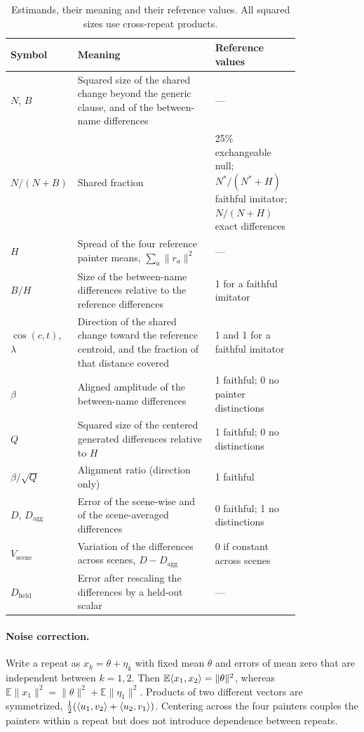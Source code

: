 \begin{table}[ht]
\caption{Estimands, their meaning and their reference values. All squared sizes use
cross-repeat products.}
\label{tab:estimands}
\vspace{2pt}
\centering\small
\begin{tabular}{@{}lp{0.52\linewidth}p{0.3\linewidth}@{}}
\toprule
Symbol & Meaning & Reference values\\
\midrule
$N$, $B$ & Squared size of the shared change beyond the generic clause, and of the
between-name differences & ---\\
$N/(N+B)$ & Shared fraction & 25\% exchangeable null; $N^*/(N^*+H)$ faithful imitator;
$N/(N+H)$ exact differences\\
$H$ & Spread of the four reference painter means, $\sum_a\|r_a\|^2$ & ---\\
$B/H$ & Size of the between-name differences relative to the reference differences & 1 for a
faithful imitator\\
$\cos(c,t)$, $\lambda$ & Direction of the shared change toward the reference centroid, and the
fraction of that distance covered & 1 and 1 for a faithful imitator\\
$\beta$ & Aligned amplitude of the between-name differences & 1 faithful; 0 no painter
distinctions\\
$Q$ & Squared size of the centered generated differences relative to $H$ & 1 faithful; 0 no
distinctions\\
$\beta/\sqrt{Q}$ & Alignment ratio (direction only) & 1 faithful\\
$D$, $D_{\mathrm{agg}}$ & Error of the scene-wise and of the scene-averaged differences & 0
faithful; 1 no distinctions\\
$V_{\mathrm{scene}}$ & Variation of the differences across scenes, $D-D_{\mathrm{agg}}$ & 0 if
constant across scenes\\
$D_{\mathrm{held}}$ & Error after rescaling the differences by a held-out scalar & ---\\
\bottomrule
\end{tabular}
\end{table}

\paragraph{Noise correction.} Write a repeat as $x_k=\theta+\eta_k$ with fixed mean $\theta$
and errors of mean zero that are independent between $k=1,2$. Then
$\mathbb E\langle x_1,x_2\rangle=\|\theta\|^2$, whereas $\mathbb E\|x_1\|^2=\|\theta\|^2+\mathbb
E\|\eta_1\|^2$. Products of two different vectors are symmetrized,
$\frac12(\langle u_1,v_2\rangle+\langle u_2,v_1\rangle)$. Centering across the four painters couples the painters
within a repeat but does not introduce dependence between repeats.

